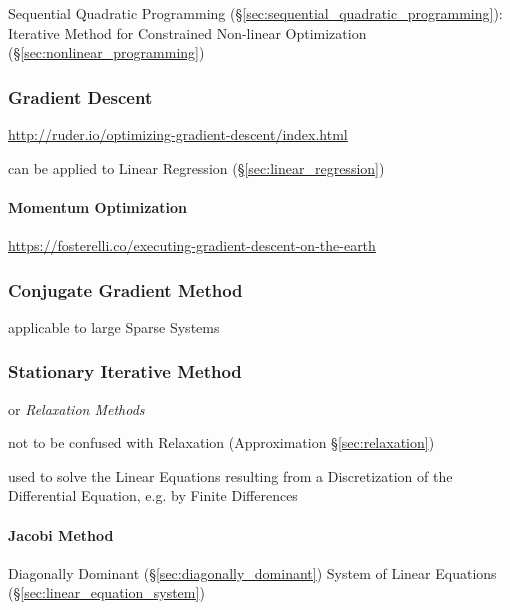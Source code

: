 \fist Sequential Quadratic Programming
(\S\ref{sec:sequential_quadratic_programming}): Iterative Method for
Constrained Non-linear Optimization (\S\ref{sec:nonlinear_programming})



\subsubsection{Gradient Descent}\label{sec:gradient_descent}

\url{http://ruder.io/optimizing-gradient-descent/index.html}

can be applied to Linear Regression (\S\ref{sec:linear_regression})



\paragraph{Momentum Optimization}\label{sec:momentum_optmization}\hfill

\url{https://fosterelli.co/executing-gradient-descent-on-the-earth}



\subsubsection{Conjugate Gradient Method}\label{sec:conjugate_gradient_method}

applicable to large Sparse Systems



\subsubsection{Stationary Iterative Method}
\label{sec:stationary_iterative}

or \emph{Relaxation Methods}

\fist not to be confused with Relaxation (Approximation \S\ref{sec:relaxation})

used to solve the Linear Equations resulting from a Discretization of the
Differential Equation, e.g. by Finite Differences



\paragraph{Jacobi Method}\label{sec:jacobi_method}\hfill

Diagonally Dominant (\S\ref{sec:diagonally_dominant}) System of Linear
Equations (\S\ref{sec:linear_equation_system})



